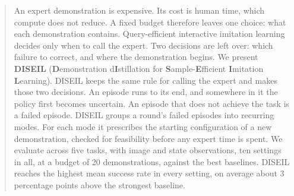 \begin{abstract}
An expert demonstration is expensive. Its cost is human time, which compute does not reduce. A fixed budget therefore leaves one choice: what each
demonstration contains. Query-efficient interactive imitation learning decides
only when to call the expert. Two decisions are left over: which failure to
correct, and where the demonstration begins. We present \textbf{DISEIL}
(\textbf{D}emonstration d\textbf{I}stillation for \textbf{S}ample-\textbf{E}fficient
\textbf{I}mitation \textbf{L}earning). DISEIL keeps the same rule for calling the
expert and makes those two decisions. An episode runs to its end, and somewhere
in it the policy first becomes uncertain. An episode that does not achieve the
task is a failed episode. DISEIL groups a round's failed episodes into recurring modes.
For each mode it prescribes the starting configuration of a new
demonstration, checked for feasibility before any expert time is spent. We
evaluate across five tasks, with image and state observations, ten settings in
all, at a budget of 20 demonstrations, against the best baselines. DISEIL reaches
the highest mean success rate in every setting, on average about 3 percentage
points above the strongest baseline.
\end{abstract}
